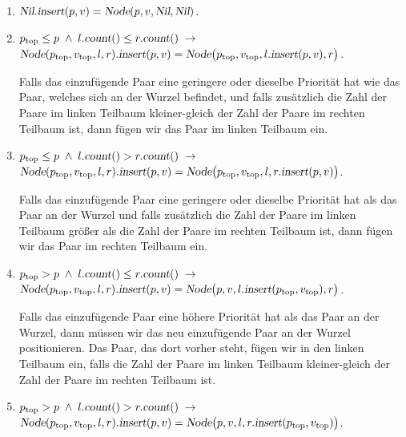 \begin{enumerate}
\item $\textsl{Nil}.\textsl{insert}(p,v) = \textsl{Node}(p,v,\textsl{Nil}, \textsl{Nil})$.
\item $p_{\mathrm{top}} \leq p \;\wedge\; l.\textsl{count}() \leq r.\textsl{count}() \;\rightarrow $   \\[0.1cm]
      \hspace*{1.3cm} 
      $\textsl{Node}(p_{\mathrm{top}},v_\mathrm{top},l,r).\textsl{insert}(p,v) =
                 \textsl{Node}\bigl(p_\mathrm{top},v_\mathrm{top},l.\textsl{insert}(p,v), r\bigr)$.

      Falls das einzuf\"ugende Paar eine geringere oder dieselbe Priorit\"at hat wie das
      Paar, welches sich an der Wurzel befindet, und falls zus\"atzlich die Zahl der Paare im linken Teilbaum
      kleiner-gleich der Zahl der Paare im rechten Teilbaum ist, dann f\"ugen wir das
      Paar im linken Teilbaum ein.
\item $p_{\mathrm{top}} \leq p \;\wedge\; l.\textsl{count}() > r.\textsl{count}() \;\rightarrow $   \\[0.1cm]
      \hspace*{1.3cm} 
      $\textsl{Node}(p_{\mathrm{top}},v_\mathrm{top},l,r).\textsl{insert}(p,v) =
                 \textsl{Node}\bigl(p_\mathrm{top},v_\mathrm{top},l,r.\textsl{insert}(p,v)\bigr)$.

      Falls das einzuf\"ugende Paar eine geringere oder dieselbe Priorit\"at hat als das
      Paar an der Wurzel und falls zus\"atzlich die Zahl der Paare im linken Teilbaum
      gr\"o\ss{}er als die Zahl der Paare im rechten Teilbaum ist, dann f\"ugen wir das
      Paar im rechten Teilbaum ein.
\item $p_{\mathrm{top}} > p \;\wedge\; l.\textsl{count}() \leq r.\textsl{count}() \;\rightarrow $ \\[0.1cm]
      \hspace*{1.3cm} 
      $\textsl{Node}(p_{\mathrm{top}},v_\mathrm{top},l,r).\textsl{insert}(p,v) =
                 \textsl{Node}\bigl(p,v,l.\textsl{insert}(p_\mathrm{top},v_\mathrm{top}), r\bigr)$.

      Falls das einzuf\"ugende Paar eine h\"ohere Priorit\"at hat als das Paar an
      der Wurzel, dann m\"ussen wir das neu einzuf\"ugende Paar an der Wurzel
      positionieren.  Das Paar, das dort vorher steht, f\"ugen wir in den linken
      Teilbaum ein, falls  die Zahl der Paare im linken Teilbaum
      kleiner-gleich der Zahl der Paare im rechten Teilbaum ist.
\item $p_{\mathrm{top}} > p \;\wedge\; l.\textsl{count}() > r.\textsl{count}() \;\rightarrow $ \\[0.1cm] 
      \hspace*{1.3cm} 
      $\textsl{Node}(p_{\mathrm{top}},v_\mathrm{top},l,r).\textsl{insert}(p,v) =
                 \textsl{Node}\bigl(p,v,l,r.\textsl{insert}(p_\mathrm{top},v_\mathrm{top})\bigr)$.


\end{enumerate}

